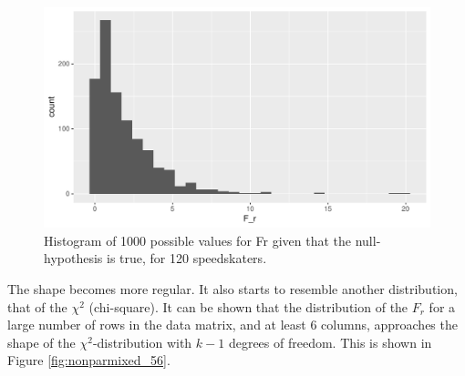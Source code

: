 \documentclass[]{book}\usepackage[]{graphicx}\usepackage[]{color}
\makeatletter
\def\maxwidth{ %
  \ifdim\Gin@nat@width>\linewidth
    \linewidth
  \else
    \Gin@nat@width
  \fi
}
\newenvironment{knitrout}{}{} %
\makeatother
\begin{document}
\begin{knitrout}
\color{fgcolor}\begin{figure}

{\centering \includegraphics[width=\maxwidth]{figure/nonparmixed_46-1} 

}

\caption[Histogram of 1000 possible values for Fr given that the null-hypothesis is true, for 120 speedskaters]{Histogram of 1000 possible values for Fr given that the null-hypothesis is true, for 120 speedskaters.}\label{fig:nonparmixed_46}
\end{figure}


\end{knitrout}

The shape becomes more regular. It also starts to resemble another distribution, that of the $\chi^2$ (chi-square). It can be shown that the distribution of the $F_r$ for a large number of rows in the data matrix, and at least 6 columns, approaches the shape of the $\chi^2$-distribution with $k-1$ degrees of freedom. This is shown in Figure \ref{fig:nonparmixed_56}.
\end{document}
